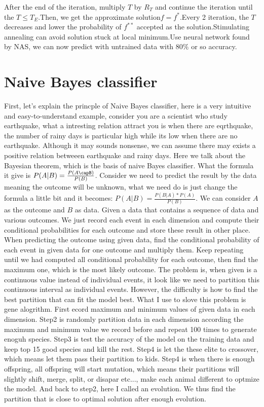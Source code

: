\documentclass[twocolumn,10pt]{article}
\begin{document}
  After the end of the iteration, multiply $T$ by $R_T$ and continue the iteration until the $T \le T_E$.Then, we get the approximate 
  solution$f=f^*$.Every 2 iteration, the $T$ decreases and lower the probability of $f^{**}$ accepted as the solution.Stimulating annealing 
  can avoid solution stuck at local minimum.Use neural network found by NAS, we can now predict with untrained data with $80\%$ or so accuracy.

\section{Naive Bayes classifier}
  First, let's explain the princple of Naive Bayes classifier, here is a very intuitive and easy-to-understand example, consider 
  you are a scientist who study earthquake, what a intresting relation attract you is when there are eqrthquake, the number of 
  rainy days is particular high while its low when there are no earthquake. Although it may sounds nonsense, we can assume there 
  may exists a positive relation betweeen earthquake and rainy days. Here we talk about the Bayesian theorem, which is the basis 
  of naive Bayes classifier. What the formula it give is $P(A|B) = \frac{P(A\capB)}{P(B)}$. Consider we need to predict the result 
  by the data meaning the outcome will be unknown, what we need do is just change the formula a little bit and it becomes: $P(A|B) = \frac{P(B|A)*P(A)}{P(B)}$. 
  We can consider $A$ as the outcome and $B$ as data. Given a data that contains a sequence of data and various outcomes. We just 
  record each event in each dimension and compute their conditional probabilities for each outcome and store these result in other 
  place. When predicting the outcome using given data, find the conditional probability of each event in given data for one outcome 
  and multiply them. Keep repeating until we had computed all conditional probability for each outcome, then find the maximum one, 
  which is the most likely outcome. The problem is, when given is a continuous value instead of individual events, it look like we 
  need to partition this continuous interval as individual events. However, the difficulty is how to find the best partition that 
  can fit the model best. What I use to slove this problem is gene alogrithm. First ecord maximum and minimum values of given data 
  in each dimension. Step2 is randomly partition data in each dimension according the maximum and minimum value we record before 
  and repeat 100 times to generate enoguh species. Step3 is test the accuracy of the model on the training data and keep top 15 
  good species and kill the rest. Step4 is let the these elite to crossover, which means let them pass their partition to kids. 
  Step4 is when there is enough offspring, all offspring will start mutation, which means their partitions will slightly shift, 
  merge, split, or disapar etc..., make each animal different to optmize the model. And back to step2, here I called an evolution. 
  We thus find the partition that is close to optimal solution after enough evolution.
\end{document}
